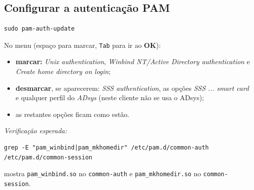 
\subsection[Configurar a autenticação PAM]{Configurar a autenticação PAM}



\begin{lstlisting}[style=bashstyle]
sudo pam-auth-update
\end{lstlisting}

No menu (espaço para marcar, \texttt{Tab} para ir ao \textbf{OK}):

\begin{itemize}
\item \textbf{marcar:} \emph{Unix authentication}, \emph{Winbind NT/Active Directory authentication} e \emph{Create home directory on login};
\item \textbf{desmarcar}, se aparecerem: \emph{SSS authentication}, as opções \emph{SSS ... smart card} e qualquer perfil do \emph{ADsys} (neste cliente não se usa o ADsys);
\item as restantes opções ficam como estão.
\end{itemize}

\emph{Verificação esperada:}

\begin{lstlisting}[style=bashstyle]
grep -E "pam_winbind|pam_mkhomedir" /etc/pam.d/common-auth /etc/pam.d/common-session
\end{lstlisting}

mostra \texttt{pam\_winbind.so} no \texttt{common-auth} e \texttt{pam\_mkhomedir.so} no \texttt{common-session}.


